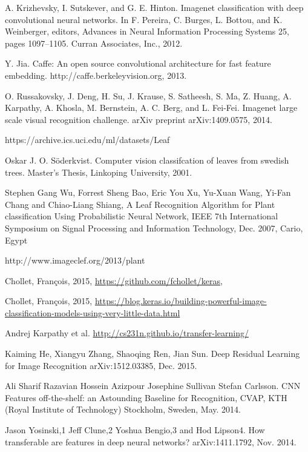 \documentclass[journal, 10pt]{IEEEtran}
\begin{document}
\begin{thebibliography}{1}
    A. Krizhevsky, I. Sutskever, and G. E. Hinton. Imagenet classification with deep convolutional neural networks. In F. Pereira, C. Burges, L. Bottou, and K. Weinberger, editors, Advances in Neural Information Processing Systems 25, pages 1097–1105. Curran Associates, Inc., 2012.

    Y. Jia. Caffe: An open source convolutional architecture for fast feature embedding. http://caffe.berkeleyvision.org, 2013.

    O. Russakovsky, J. Deng, H. Su, J. Krause, S. Satheesh, S. Ma, Z. Huang, A. Karpathy, A. Khosla, M. Bernstein, A. C. Berg, and L. Fei-Fei. Imagenet large scale visual recognition challenge. arXiv preprint arXiv:1409.0575, 2014.

    https://archive.ics.uci.edu/ml/datasets/Leaf

    Oskar J. O. Söderkvist. Computer vision classifcation of leaves from swedish trees. Master's Thesis, Linkoping University, 2001.

    Stephen Gang Wu, Forrest Sheng Bao, Eric You Xu, Yu-Xuan Wang, Yi-Fan Chang and Chiao-Liang Shiang, A Leaf Recognition Algorithm for Plant classification Using Probabilistic Neural Network, IEEE 7th International Symposium on Signal Processing and Information Technology, Dec. 2007, Cario, Egypt

    http://www.imageclef.org/2013/plant

    Chollet, Fran\c{c}ois, 2015, \url{https://github.com/fchollet/keras},

    Chollet, Fran\c{c}ois, 2015, \url{ https://blog.keras.io/building-powerful-image-classification-models-using-very-little-data.html}

    Andrej Karpathy et al. \url{http://cs231n.github.io/transfer-learning/}

    Kaiming He, Xiangyu Zhang, Shaoqing Ren, Jian Sun. Deep Residual Learning for Image Recognition 	arXiv:1512.03385, Dec. 2015.

    Ali Sharif Razavian Hossein Azizpour Josephine Sullivan Stefan Carlsson. CNN Features off-the-shelf: an Astounding Baseline for Recognition, CVAP, KTH (Royal Institute of Technology) Stockholm, Sweden, May. 2014.

    Jason Yosinski,1 Jeff Clune,2 Yoshua Bengio,3 and Hod Lipson4. How transferable are features in deep neural networks? arXiv:1411.1792, Nov. 2014.


\end{thebibliography}
\end{document}
